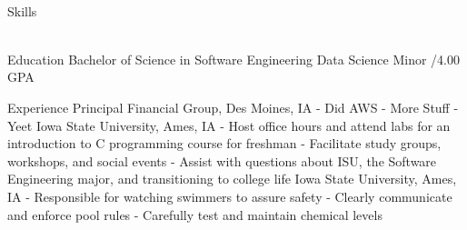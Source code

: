 \documentclass[]{resume}
\begin{document}



\begin{subheader}{1}
    \\
\end{subheader}

\begin{topic}{Skills}
    \\
    \\
\end{topic}

\begin{topic}{Education}
    {Bachelor of Science in Software Engineering}
    {Data Science Minor /4.00 GPA}\\
\end{topic}

\begin{topic}{Experience}
    {Principal Financial Group, Des Moines, IA}
    {
        - Did AWS \newline
        - More Stuff \newline
        - Yeet
    }
    {Iowa State University, Ames, IA}
    {
        - Host office hours and attend labs for an introduction to C programming course for freshman \newline
        - Facilitate study groups, workshops, and social events \newline
        - Assist with questions about ISU, the Software Engineering major, and transitioning to college life
    }
    {Iowa State University, Ames, IA}
    {
        - Responsible for watching swimmers to assure safety \newline
        - Clearly communicate and enforce pool rules \newline
        - Carefully test and maintain chemical levels
    }\\
\end{topic}
\end{document}
